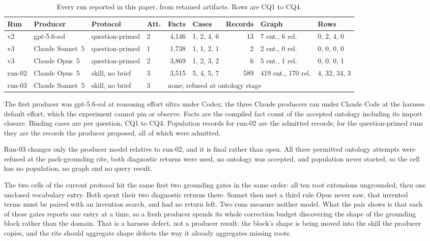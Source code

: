 \documentclass[10pt]{article}
\begin{document}
\begin{table}[h!]
\centering
\caption{Every run reported in this paper, from retained artifacts. Rows are CQ1 to CQ4.}
\label{tab:runs}
\footnotesize
\begin{tabular}{@{}l l l l r l r l l@{}}
\toprule
Run & Producer & Protocol & Att. & Facts & Cases & Records & Graph & Rows \\
\midrule
v2 & gpt-5.6-sol & question-primed & 2 & 4,146 & 1, 2, 4, 6 & 13 & 7 ent., 6 rel. & 0, 2, 4, 0 \\
v3 & Claude Sonnet~5 & question-primed & 1 & 1,738 & 1, 1, 2, 1 & 2 & 2 ent., 0 rel. & 0, 0, 0, 0 \\
v3 & Claude Opus~5 & question-primed & 2 & 3,869 & 1, 2, 3, 2 & 6 & 5 ent., 1 rel. & 0, 0, 0, 1 \\
run-02 & Claude Opus~5 & skill, no brief & 3 & 3,515 & 5, 4, 5, 7 & 589 & 419 ent., 170 rel. & 4, 32, 34, 3 \\
run-03 & Claude Sonnet~5 & skill, no brief & 3 & \multicolumn{5}{l}{none; refused at ontology stage} \\
\bottomrule
\end{tabular}
\end{table}

The first producer was gpt-5.6-sol at reasoning effort ultra under Codex; the three Claude producers ran under Claude Code at the harness default effort, which the experiment cannot pin or observe. Facts are the compiled fact count of the accepted ontology including its import closure. Binding cases are per question, CQ1 to CQ4. Population records for run-02 are the admitted records; for the question-primed runs they are the records the producer proposed, all of which were admitted.

Run-03 changes only the producer model relative to run-02, and it is final rather than open. All three permitted ontology attempts were refused at the pack-grounding rite, both diagnostic returns were used, no ontology was accepted, and population never started, so the cell has no population, no graph and no query result.

The two cells of the current protocol hit the same first two grounding gates in the same order: all ten root extensions ungrounded, then one unclosed vocabulary entry. Both spent their two diagnostic returns there. Sonnet then met a third rule Opus never saw, that invented terms must be paired with an invention search, and had no return left. Two runs measure neither model. What the pair shows is that each of these gates reports one entry at a time, so a fresh producer spends its whole correction budget discovering the shape of the grounding block rather than the domain. That is a harness defect, not a producer result: the block's shape is being moved into the skill the producer copies, and the rite should aggregate shape defects the way it already aggregates missing roots.
\end{document}
